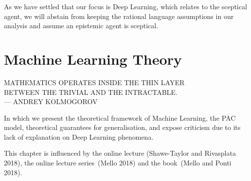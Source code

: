 \documentclass[
  letterpaper,
  12pt,
  british]{tufte-book}
\renewcommand{\textls}[2][5]{%
  \begingroup\addfontfeatures{LetterSpace=#1}#2\endgroup
}
\renewcommand{\allcaps}[1]{\textls[15]{\MakeTextUppercase{#1}}}
\newcommand{\epigraph}[2]{%
  \begin{fullwidth}
  \begin{flushright}
  \sffamily\fontsize{8}{10}\selectfont
  \sffamily\footnotesize
  \begin{doublespace}
  \vspace{-8cm}\noindent\allcaps{#1}\\%
  \noindent\allcaps{#2}\\%
  \end{doublespace}
  \vspace{5.1cm}
  \end{flushright}
  \end{fullwidth}
  \normalfont
}
\renewenvironment{quote}{
  \list{}{\leftmargin=3.5cm\topsep=0pt}
  \item\relax\small\itshape
}
{\endlist}
\theoremstyle{plain}
\theoremstyle{definition}
\theoremstyle{plain}
\theoremstyle{remark}
\begin{document}
As we have settled that our focus is Deep Learning, which relates to the
sceptical agent, we will abstain from keeping the rational language
assumptions in our analysis and assume an epistemic agent is sceptical.

\begin{quote}
\end{quote}

\hypertarget{machine-learning-theory}{%
\chapter{Machine Learning Theory}\label{machine-learning-theory}}

\epigraph{Mathematics operates inside the thin layer \\
    between the trivial and the intractable.}{--- Andrey Kolmogorov}

In which we present the theoretical framework of Machine Learning, the
PAC model, theoretical guarantees for generalisation, and expose
criticism due to its lack of explanation on Deep Learning phenomena.

This chapter is influenced by the online lecture (Shawe-Taylor and
Rivasplata
2018),
the online lecture series~(Mello
2018)
and the book~(Mello and Ponti
2018).
\end{document}
